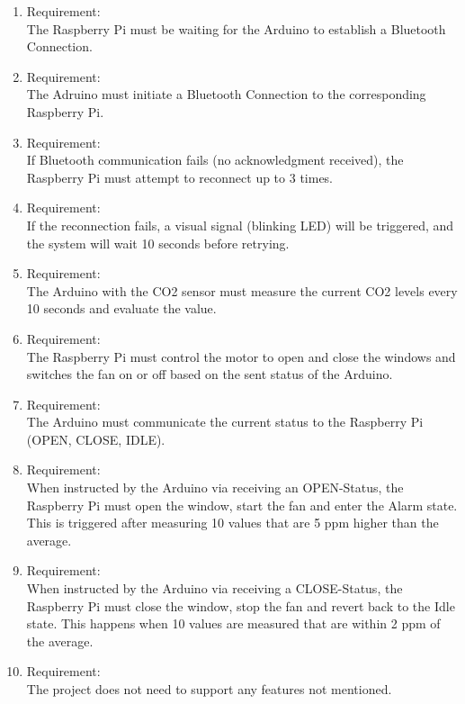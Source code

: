     \begin{enumerate}[label*=\arabic*.]
        \item \label{qreq.1}  Requirement:  \\
        The Raspberry Pi must be waiting for the Arduino to establish a Bluetooth Connection. \\ 
        \item \label{qreq.2}  Requirement:  \\
        The Adruino must initiate a Bluetooth Connection to the corresponding Raspberry Pi. \\ 
        \item \label{qreq.3}  Requirement:  \\
        If Bluetooth communication fails (no acknowledgment received), the Raspberry Pi must attempt to reconnect up to 3 times. \\ 
        \item \label{qreq.4}  Requirement:  \\
        If the reconnection fails, a visual signal (blinking LED) will be triggered, and the system will wait 10 seconds before retrying. \\ 
        \item \label{qreq.5}  Requirement:  \\
        The Arduino with the CO2 sensor must measure the current CO2 levels every 10 seconds and evaluate the value. \\ 
        \item \label{qreq.6}  Requirement:  \\
        The Raspberry Pi must control the motor to open and close the windows and switches the fan on or off based on the sent status of the Arduino.\\ 
        \item \label{qreq.7}  Requirement:  \\
        The Arduino must communicate the current status to the Raspberry Pi (OPEN, CLOSE, IDLE).\\ 
        \item \label{qreq.8}  Requirement:  \\
        When instructed by the Arduino via receiving an OPEN-Status, the Raspberry Pi must open the window, start the fan and enter the Alarm state. This is triggered after measuring 10 values that are 5 ppm higher than the average.\\ 
        \item \label{qreq.9}  Requirement:  \\
        When instructed by the Arduino via receiving a CLOSE-Status, the Raspberry Pi must close the window, stop the fan and revert back to the Idle state. This happens when 10 values are measured that are within 2 ppm of the average. \\ 
        \item \label{qreq.10}  Requirement:  \\
        The project does not need to support any features not mentioned. \\
        
    \end{enumerate} 
    
